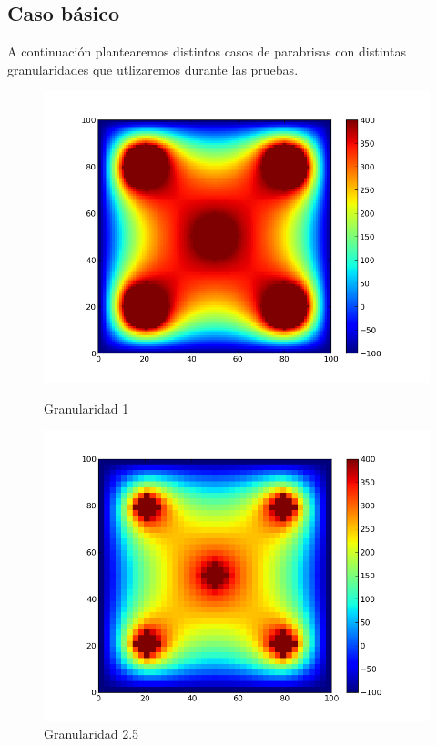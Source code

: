 \subsection{Caso básico}
\newpage
A continuación plantearemos distintos casos de parabrisas con distintas granularidades que utlizaremos durante las pruebas. 

\begin{figure}[htb]

\begin{center}
       \includegraphics[scale=0.3]{imagenes/test5_gran1.png}
                \caption{Granularidad 1}
        \end{center}
\endminipage\hfill
{}
\begin{center}
        \includegraphics[scale=0.3]{imagenes/test5.png}
                \caption{Granularidad 2.5}
        \end{center}
\endminipage\hfill 
\end{figure}

